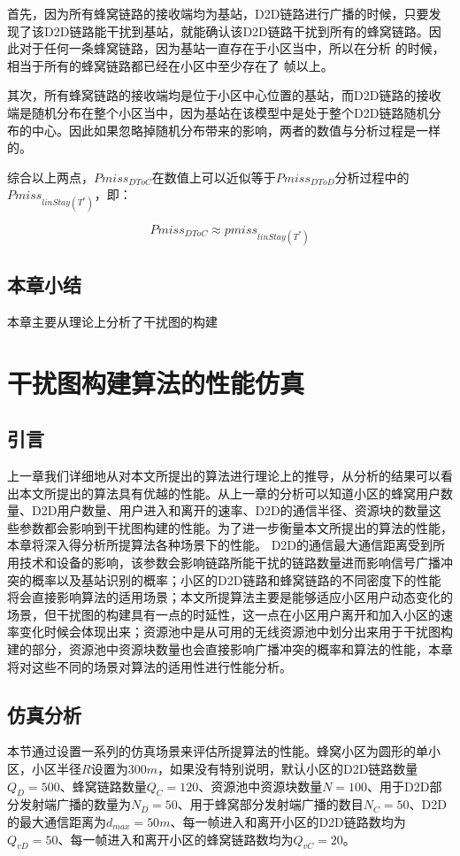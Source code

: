 \documentclass[figurelist,tablelist,algorithmlist,nomlist,masters]{seuthesix}
\begin{document}
	首先，因为所有蜂窝链路的接收端均为基站，D2D链路进行广播的时候，只要发现了该D2D链路能干扰到基站，就能确认该D2D链路干扰到所有的蜂窝链路。因此对于任何一条蜂窝链路，因为基站一直存在于小区当中，所以在分析 的时候，相当于所有的蜂窝链路都已经在小区中至少存在了 帧以上。
	
	其次，所有蜂窝链路的接收端均是位于小区中心位置的基站，而D2D链路的接收端是随机分布在整个小区当中，因为基站在该模型中是处于整个D2D链路随机分布的中心。因此如果忽略掉随机分布带来的影响，两者的数值与分析过程是一样的。
	
	综合以上两点，$Pmis{s_{DToC}}$在数值上可以近似等于$Pmis{s_{DToD}}$分析过程中的$Pmis{s_{linStay({T^*})}}$，即：
	
	\begin{equation}\label{eq3.1}
	Pmis{s_{DToC}} \approx pmis{s_{linStay({T^*})}}
	\end{equation}
	
	\section{本章小结}
	本章主要从理论上分析了干扰图的构建
	
	
	
	\chapter{干扰图构建算法的性能仿真}
	\section{引言}
	上一章我们详细地从对本文所提出的算法进行理论上的推导，从分析的结果可以看出本文所提出的算法具有优越的性能。从上一章的分析可以知道小区的蜂窝用户数量、D2D用户数量、用户进入和离开的速率、D2D的通信半径、资源块的数量这些参数都会影响到干扰图构建的性能。为了进一步衡量本文所提出的算法的性能，本章将深入得分析所提算法各种场景下的性能。
	D2D的通信最大通信距离受到所用技术和设备的影响，该参数会影响链路所能干扰的链路数量进而影响信号广播冲突的概率以及基站识别的概率；小区的D2D链路和蜂窝链路的不同密度下的性能将会直接影响算法的适用场景；本文所提算法主要是能够适应小区用户动态变化的场景，但干扰图的构建具有一点的时延性，这一点在小区用户离开和加入小区的速率变化时候会体现出来；资源池中是从可用的无线资源池中划分出来用于干扰图构建的部分，资源池中资源块数量也会直接影响广播冲突的概率和算法的性能，本章将对这些不同的场景对算法的适用性进行性能分析。
	
	\section{仿真分析}
	本节通过设置一系列的仿真场景来评估所提算法的性能。蜂窝小区为圆形的单小区，小区半径$R$设置为$300m$，如果没有特别说明，默认小区的D2D链路数量$Q_D = 500$、蜂窝链路数量$Q_C = 120$、资源池中资源块数量$N = 100$、用于D2D部分发射端广播的数量为$N_D = 50$、用于蜂窝部分发射端广播的数目$N_C = 50$、D2D的最大通信距离为$d_{max} = 50m$、每一帧进入和离开小区的D2D链路数均为$Q_{vD} = 50$、每一帧进入和离开小区的蜂窝链路数均为$Q_{vC} = 20$。
	
\end{document}
